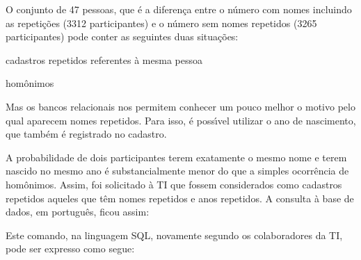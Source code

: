 \documentclass[
12pt,		%
openright,	%
twoside,  %
a4paper,			%
chapter=TITLE,		%
english,			%
french,				%
spanish,			%
brazil				%
]{USPSC-classe/USPSC_RedarTex}
\begin{document}
O conjunto de 47 pessoas, que \'e a diferen\c{c}a entre o n\'umero com nomes incluindo as repeti\c{c}\~oes (3312 participantes) e o n\'umero sem nomes repetidos (3265 participantes) pode conter as seguintes duas situa\c{c}\~oes:









\begin{alineas}
\item cadastros repetidos referentes \`a mesma pessoa
\item hom\^onimos
\end{alineas}

Mas os bancos relacionais nos permitem conhecer um pouco melhor o motivo pelo qual aparecem nomes repetidos. Para isso, \'e poss\'{\i}vel utilizar o ano de nascimento, que tamb\'em \'e registrado no cadastro.








A probabilidade de dois participantes terem exatamente o mesmo nome e terem nascido no mesmo ano \'e substancialmente menor do que a simples ocorr\^encia de hom\^onimos. Assim, foi solicitado \`a TI que fossem considerados como cadastros repetidos aqueles que t\^em nomes repetidos e anos repetidos. A consulta \`a base de dados, em portugu\^es, ficou assim:









\noindent\begin{center}\mbox{\centering{}}\end{center}


Este comando, na linguagem SQL, novamente segundo os colaboradores da TI, pode ser expresso como segue:









\noindent\begin{center}\mbox{\centering{}}\end{center}
\end{document}
